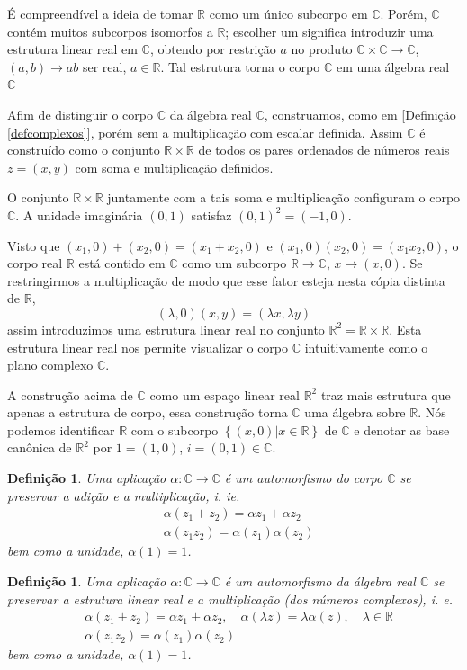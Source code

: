 \documentclass[12pt, oneside, a4paper, english, brazil]{abntex2}
\providecommand{\p}[1]{\left( #1 \right)}
\providecommand{\chaves}[1]{\left\{ #1 \right\}}
\providecommand{\R}{\mathbb{R}}
\providecommand{\Rdois}{\mathbb{R}^2}
\newcommand{\C}{\mathbb{C}}
\providecommand{\definitionref}[1]{[Definição \ref{#1}]}
\newcounter{geral}
\theoremstyle{normal}
\newtheorem{definition}[geral]{Definição}
\theoremstyle{observacao}
\begin{document}
É compreendível a ideia de tomar $\R$ como um único subcorpo em $\C$. Porém, $\C$ contém muitos subcorpos isomorfos a $\R$; escolher um significa introduzir uma estrutura linear real em $\C$, obtendo por restrição $a$ no produto $\C \times \C \to \C$, $(a,b)\to ab$ ser real, $a \in \R$. Tal estrutura torna o corpo $\C$ em uma álgebra real $\C$

Afim de distinguir o corpo $\C$ da álgebra real $\C$, construamos, como em \definitionref{defcomplexos}, porém sem a multiplicação com escalar definida. Assim $\C$ é construído como o conjunto $\R \times \R$ de todos os pares ordenados de números reais $z=(x,y)$ com soma e multiplicação definidos.

O conjunto $\R \times \R$ juntamente com a tais soma e multiplicação configuram o corpo $\C$. A unidade imaginária $(0,1)$ satisfaz $(0,1)^2=(-1,0)$.

Visto que $(x_1,0)+(x_2,0)=(x_1+x_2,0)$ e $(x_1,0)(x_2,0)=(x_1x_2,0)$, o corpo real $\R$ está contido em $\C$ como um subcorpo $\R \to \C$, $x \to (x,0)$. Se restringirmos a multiplicação de modo que esse fator esteja nesta cópia distinta de $\R$,
\[
(\lambda,0)(x,y)=(\lambda x,\lambda y)
\]
assim introduzimos uma estrutura linear real no conjunto $\Rdois = \R \times \R$. Esta estrutura linear real nos permite visualizar o corpo $\C$ intuitivamente como o plano complexo $\C$. 

A construção acima de $\C$ como um espaço linear real $\Rdois$ traz mais estrutura que apenas a estrutura de corpo, essa construção torna $\C$ uma álgebra sobre $\R$. Nós podemos identificar $\R$ com o subcorpo $\chaves{(x,0) | x \in \R}$ de $\C$ e denotar as base canônica de $\Rdois$ por $1=(1,0)$, $i=(0,1) \in \C$.

\begin{definition}
Uma aplicação $\alpha: \C \to \C$ é um automorfismo do corpo $\C$ se preservar a adição e a multiplicação, i. ie.
\begin{align*}
&\alpha\p{z_1+z_2} = \alpha z_1 + \alpha z_2 \\
&\alpha\p{z_1z_2} = \alpha(z_1)\alpha(z_2)
\end{align*}
bem como a unidade, $\alpha(1)=1$.
\end{definition}

\begin{definition}
Uma aplicação $\alpha: \C \to \C$ é um automorfismo da álgebra real $\C$ se preservar a estrutura linear real e a multiplicação (dos números complexos), i. e. 
\begin{align*}
&\alpha\p{z_1+z_2} = \alpha z_1 + \alpha z_2, \quad \alpha(\lambda z) = \lambda \alpha(z), \quad \lambda \in \R \\
&\alpha\p{z_1z_2} = \alpha(z_1)\alpha(z_2)
\end{align*}
bem como a unidade, $\alpha(1)=1$.
\end{definition}
\end{document}
